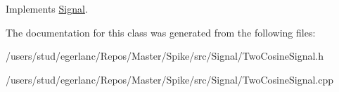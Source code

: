 Implements \hyperlink{classSignal_a32c22f17b70b215d78171716f844fa60}{Signal}.



The documentation for this class was generated from the following files\+:\begin{DoxyCompactItemize}
\item 
/users/stud/egerlanc/\+Repos/\+Master/\+Spike/src/\+Signal/Two\+Cosine\+Signal.\+h\item 
/users/stud/egerlanc/\+Repos/\+Master/\+Spike/src/\+Signal/Two\+Cosine\+Signal.\+cpp\end{DoxyCompactItemize}
